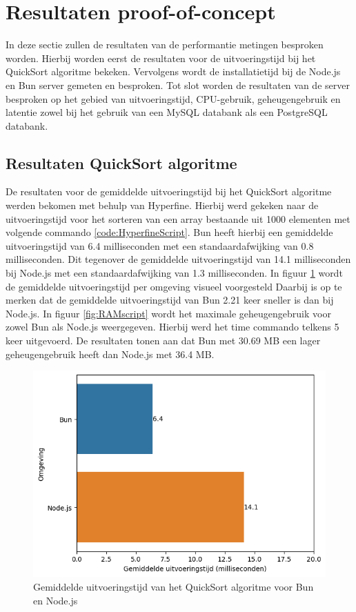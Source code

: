 \section{Resultaten proof-of-concept}
In deze sectie zullen de resultaten van de performantie metingen besproken worden.
Hierbij worden eerst de resultaten voor de uitvoeringstijd bij het QuickSort algoritme bekeken.
Vervolgens wordt de installatietijd bij de Node.js en Bun server gemeten en besproken.
Tot slot worden de resultaten van de server besproken op het gebied van uitvoeringstijd, CPU-gebruik, geheugengebruik en latentie
zowel bij het gebruik van een MySQL databank als een PostgreSQL databank. 

\subsection{Resultaten  QuickSort algoritme}
De resultaten voor de gemiddelde uitvoeringstijd bij het QuickSort algoritme werden bekomen met behulp van Hyperfine.
Hierbij werd gekeken naar de uitvoeringstijd voor het sorteren van een array bestaande uit 1000 elementen met volgende commando \ref{code:HyperfineScript}.
Bun heeft hierbij een gemiddelde uitvoeringstijd van 6.4 milliseconden met een standaardafwijking van 0.8 milliseconden. 
Dit tegenover de gemiddelde uitvoeringstijd van 14.1 milliseconden bij Node.js met een standaardafwijking van 1.3 milliseconden.
In figuur \ref{fig:uitvoeringstijdscript} wordt de gemiddelde uitvoeringstijd per omgeving visueel voorgesteld
Daarbij is op te merken dat de gemiddelde uitvoeringstijd van Bun 2.21 keer sneller is dan bij Node.js.
In figuur \ref{fig:RAMscript} wordt het maximale geheugengebruik voor zowel Bun als Node.js weergegeven. 
Hierbij werd het time commando telkens 5 keer uitgevoerd.
De resultaten tonen aan dat Bun met 30.69 MB een lager geheugengebruik heeft dan Node.js met 36.4 MB.
\begin{figure}[H]
  \centering
  \includegraphics{graphics/scriptuitvoeringstijd.png}
  \caption[Uitvoeringstijd QuickSort algoritme]{\label{fig:uitvoeringstijdscript}Gemiddelde uitvoeringstijd van het QuickSort algoritme voor Bun en Node.js}
\end{figure}

